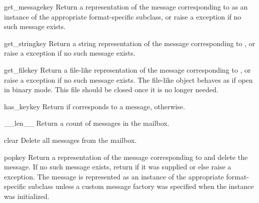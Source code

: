 \begin{methoddesc}{get_message}{key}
Return a representation of the message corresponding to  as an
instance of the appropriate format-specific  subclass, or raise
a  exception if no such message exists.
\end{methoddesc}

\begin{methoddesc}{get_string}{key}
Return a string representation of the message corresponding to , or
raise a  exception if no such message exists.
\end{methoddesc}

\begin{methoddesc}{get_file}{key}
Return a file-like representation of the message corresponding to ,
or raise a  exception if no such message exists. The
file-like object behaves as if open in binary mode. This file should be closed
once it is no longer needed.

\end{methoddesc}

\begin{methoddesc}{has_key}{key}
Return  if  corresponds to a message, 
otherwise.
\end{methoddesc}

\begin{methoddesc}{__len__}{}
Return a count of messages in the mailbox.
\end{methoddesc}

\begin{methoddesc}{clear}{}
Delete all messages from the mailbox.
\end{methoddesc}

\begin{methoddesc}{pop}{key}
Return a representation of the message corresponding to  and delete
the message. If no such message exists, return  if it was supplied
or else raise a  exception. The message is represented as
an instance of the appropriate format-specific  subclass unless
a custom message factory was specified when the  instance was
initialized.
\end{methoddesc}

